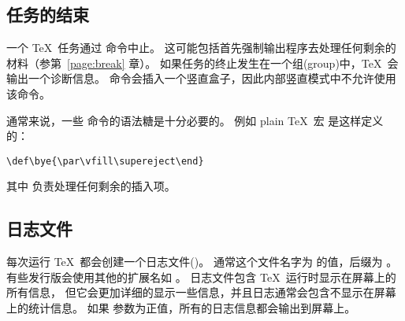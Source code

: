 \documentclass{book}
\begin{document}
\subsection{任务的结束}

一个 \TeX\ 任务通过  命令中止。
这可能包括首先强制输出程序去处理任何剩余的材料（参第~\ref{page:break} 章）。
如果任务的终止发生在一个组(group)中，\TeX\ 会输出一个诊断信息。
 命令会插入一个竖直盒子，因此内部竖直模式中不允许使用该命令。

通常来说，一些  命令的语法糖是十分必要的。
例如 plain \TeX\ 宏  是这样定义的：
\begin{verbatim}
\def\bye{\par\vfill\supereject\end}
\end{verbatim}
其中  负责处理任何剩余的插入项。

\subsection{日志文件}

每次运行 \TeX\ 都会创建一个日志文件()。
通常这个文件名字为  的值，后缀为 。
有些发行版会使用其他的扩展名如 。
日志文件包含 \TeX\ 运行时显示在屏幕上的所有信息，
但它会更加详细的显示一些信息，并且日志通常会包含不显示在屏幕上的统计信息。
如果  参数为正值，所有的日志信息都会输出到屏幕上。
\end{document}
